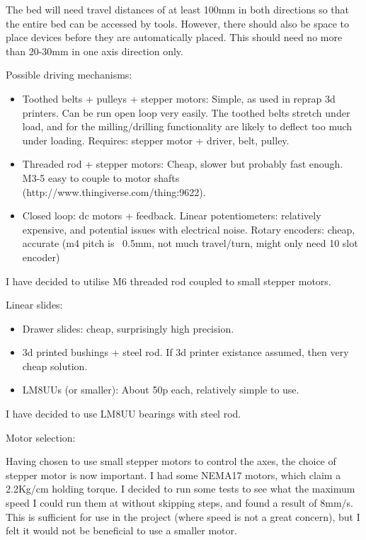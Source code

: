 \documentclass[a4paper,11pt]{article}  %
\begin{document}
The bed will need travel distances of at least 100mm in both directions so that the entire bed can be accessed by tools. However,
there should also be space to place devices before they are automatically placed. This should need no more than 20-30mm in one axis
direction only.

Possible driving mechanisms:

\begin{itemize}
	\item	Toothed belts + pulleys + stepper motors: Simple, as used in reprap 3d printers. Can be run open loop
		very easily. The toothed belts stretch under load, and for the milling/drilling functionality are likely to deflect too much under loading.
		Requires: stepper motor + driver, belt, pulley.
	\item	Threaded rod + stepper motors: Cheap, slower but probably fast enough. M3-5 easy to couple
		to motor shafts (http://www.thingiverse.com/thing:9622).
	\item	Closed loop: dc motors + feedback. Linear potentiometers: relatively expensive, and potential
		issues with electrical noise. Rotary encoders: cheap, accurate (m4 pitch is ~0.5mm, not much
		travel/turn, might only need 10 slot encoder)

\end{itemize}

I have decided to utilise M6 threaded rod coupled to small stepper motors.

Linear slides:

\begin{itemize}
	\item	Drawer slides: cheap, surprisingly high precision.
	\item	3d printed bushings + steel rod. If 3d printer existance assumed, then very cheap solution.
	\item	LM8UUs (or smaller): About 50p each, relatively simple to use.
\end{itemize}

I have decided to use LM8UU bearings with steel rod. 

Motor selection:

Having chosen to use small stepper motors to control the axes, the choice of stepper motor is now important. I had
some NEMA17 motors, which claim a 2.2Kg/cm holding torque. I decided to run some tests to see what the maximum
speed I could run them at without skipping steps, and found a result of 8mm/s. This is sufficient for use in the
project (where speed is not a great concern), but I felt it would not be beneficial to use a smaller motor. 
\end{document}
